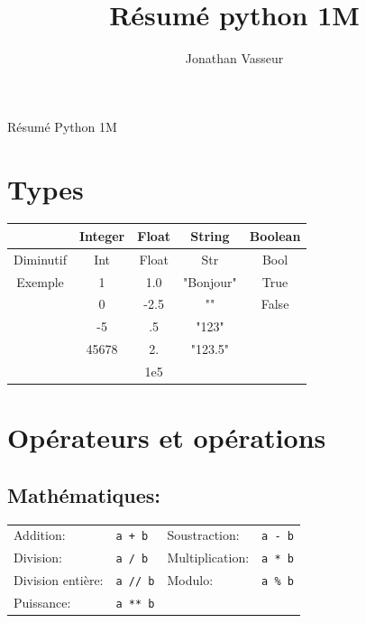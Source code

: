 \documentclass[a4paper,12pt,twoside]{article}
\author{Jonathan Vasseur}
\title{Résumé python 1M}
\newenvironment{ltitle}
     {\begin{center}\Huge}
     {\end{center}\par}
\begin{document}
    \begin{ltitle}
Résumé Python 1M
    \end{ltitle}


    \section*{Types}
    \begin{center}
    
        \begin{tabular}{||c|c|c|c|c||}
        \hline \hline
                    &\textbf{Integer}  & \textbf{Float} & \textbf{String} & \textbf{Boolean} \\
        \hline
        Diminutif   & Int   & Float  & Str  & Bool \\
        \hline
        Exemple     & 1     & 1.0    & "Bonjour" & True \\
                    & 0     & -2.5   & ""     & False   \\
                    & -5    & .5     & "123"  &         \\
                    & 45678 & 2.     & "123.5"&         \\
                    &       &1e5     &        &         \\
        \hline \hline
        \end{tabular}
    \end{center}

    \section*{Opérateurs et opérations}

    \subsection*{Mathématiques:}
    \begin{tabular}{l l | l l}
        Addition: & \texttt{a + b} &
        Soustraction: & \texttt{a - b} \\ 
        Division: & \texttt{a / b} &
        Multiplication: & \texttt{a * b}  \\
        Division entière: & \texttt{a // b} &
        Modulo: & \texttt{a \% b} \\
        Puissance:& \texttt{a ** b} 
    \end{tabular}
\end{document}
